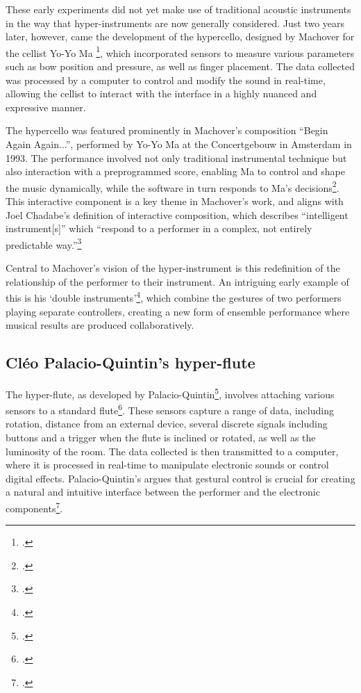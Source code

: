 \documentclass[12pt,twoside,maitrise]{dms_ks}
\theoremstyle{definition}
\begin{document}
{These early experiments did not yet make use of traditional acoustic instruments in the way that hyper-instruments are now generally considered. 
Just two years later, however, came the development of the hypercello, designed by Machover for the cellist Yo-Yo Ma \footcite[15]{levenson_taming_1994}, which incorporated sensors to measure various parameters such as bow position and pressure, as well as finger placement.
The data collected was processed by a computer to control and modify the sound in real-time, allowing the cellist to interact with the interface in a highly nuanced and expressive manner.

The hypercello was featured prominently in Machover's composition “Begin Again Again...”, performed by Yo-Yo Ma at the Concertgebouw in Amsterdam in 1993. 
The performance involved not only traditional instrumental technique but also interaction with a preprogrammed score, enabling Ma to control and shape the music dynamically, while the software in turn responds to Ma's decisions\footcite[16]{levenson_taming_1994}. 
This interactive component is a key theme in Machover's work, and aligns with Joel Chadabe's definition of interactive composition, which describes “intelligent instrument[s]” which “respond to a performer in a complex, not entirely predictable way.”\footcite[23]{chadabe_interactive_1984}

Central to Machover's vision of the hyper-instrument is this redefinition of the relationship of the performer to their instrument. 
An intriguing early example of this is his `double instruments'\footcite[189]{machover_hyper-instruments_1989}, which combine the gestures of two performers playing separate controllers, creating a new form of ensemble performance where musical results are produced collaboratively.

\subsection{Cléo Palacio-Quintin's hyper-flute}

The hyper-flute, as developed by Palacio-Quintin\footcite{palacio-quintin_souffles_2017}, involves attaching various sensors to a standard flute\footcite[27]{palacio-quintin_composition_2012-1}. 
These sensors capture a range of data, including rotation, distance from an external device, several discrete signals including buttons and a trigger when the flute is inclined or rotated, as well as the luminosity of the room. 
The data collected is then transmitted to a computer, where it is processed in real-time to manipulate electronic sounds or control digital effects. 
Palacio-Quintin's argues that gestural control is crucial for creating a natural and intuitive interface between the performer and the electronic components\footcite[12]{palacio-quintin_composition_2012-1}. 

}
\end{document}
